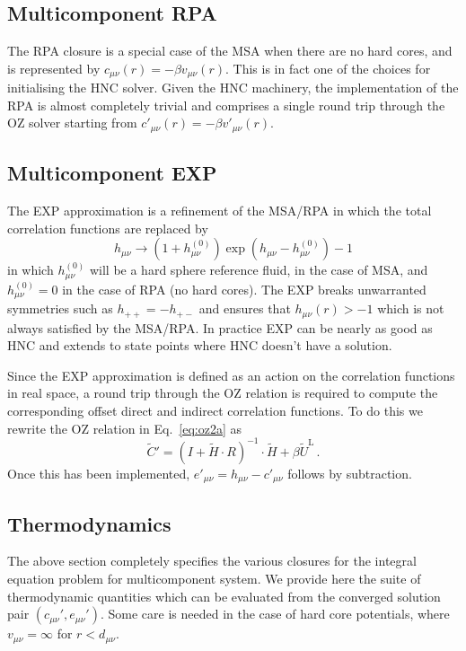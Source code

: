 \documentclass[12pt,a4paper]{article}
\newcommand{\lr}{^{\mathrm{L}}}
\newcommand{\href}{h^{(0)}}
\newcommand{\Eqref}[1]{Eq.~\eqref{#1}}
\begin{document}
\subsection{Multicomponent RPA}\label{sec:RPA}
%
The RPA closure is a special case of the MSA when there are no hard
cores, and is represented by $c_{\mu\nu}(r)=-\beta v_{\mu\nu}(r)$.
This is in fact one of the choices for initialising the HNC solver.
Given the HNC machinery, the implementation of the RPA is almost
completely trivial and comprises a single round trip through the OZ
solver starting from $c'_{\mu\nu}(r)=-\beta v'_{\mu\nu}(r)$.

\subsection{Multicomponent EXP}\label{sec:EXP}
%
The EXP approximation is a  refinement of the MSA/RPA
in which the  total correlation functions are replaced by
%
\begin{equation}
  h_{\mu\nu}\to(1+\href_{\mu\nu})\exp(h_{\mu\nu}-\href_{\mu\nu})-1
  \label{eq:exp}
\end{equation}
%
in which $\href_{\mu\nu}$ will be a hard sphere reference fluid, in
the case of MSA, and $\href_{\mu\nu}=0$ in the case of RPA (no hard
cores).  The EXP breaks unwarranted symmetries such as
$h_{++}=-h_{+-}$ and ensures that $h_{\mu\nu}(r)>-1$ which is not
always satisfied by the MSA/RPA.  In practice EXP can be nearly as
good as HNC and extends to state points where HNC doesn't have a
solution.

Since the EXP approximation is defined as an action on the correlation
functions in real space, a round trip through the OZ relation is
required to compute the corresponding offset direct and indirect
correlation functions.  To do this we rewrite the OZ relation in
\Eqref{eq:oz2a} as
%
\begin{equation}
{\tilde C}' = (I+{\tilde H}\cdot R)^{-1}\cdot{\tilde H}
 + \beta{\tilde U}\lr\,.
\label{eq:ozndb}
\end{equation}
%
Once this has been implemented, $e'_{\mu\nu}= h_{\mu\nu} -
c'_{\mu\nu}$ follows by subtraction.

\subsection{Thermodynamics}
\label{sec:thermo}
%
The above section completely specifies the various closures for the
integral equation problem for multicomponent system.  We provide here
the suite of thermodynamic quantities which can be evaluated from the
converged solution pair $(c_{\mu\nu}', e_{\mu\nu}')$.  Some care is
needed in the case of hard core potentials, where $v_{\mu\nu}=\infty$
for $r<d_{\mu\nu}$.
\end{document}
